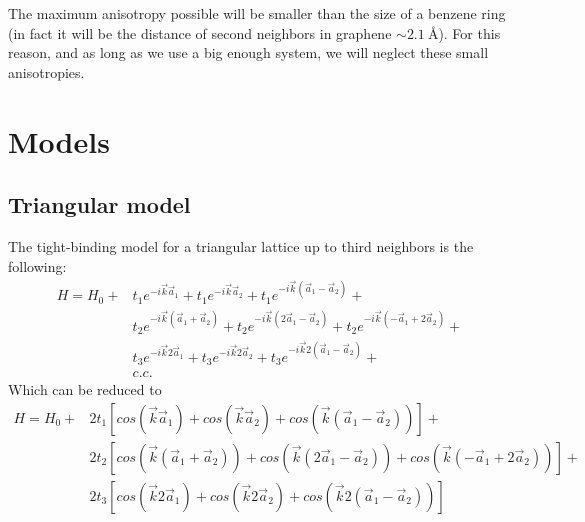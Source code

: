 The maximum anisotropy possible will be smaller than the size of a benzene ring (in fact it will be the distance of second neighbors in graphene $\sim\SI{2.1}{\angstrom}$). For this reason, and as long as we use a big enough system, we will neglect these small anisotropies.


\section{Models} %
\label{models}
\subsection{Triangular model}
The tight-binding model for a triangular lattice up to third neighbors is the following:
\begin{equation}
  \begin{split}
  H = H_0 +
      &t_1e^{-i\vec{k}\vec{a}_1} + t_1e^{-i\vec{k}\vec{a}_2} + t_1e^{-i\vec{k}(\vec{a}_1-\vec{a}_2)}+\\
      &t_2e^{-i\vec{k}(\vec{a}_1+\vec{a}_2)} + t_2e^{-i\vec{k}(2\vec{a}_1-\vec{a}_2)} +
      t_2e^{-i\vec{k}(-\vec{a}_1+2\vec{a}_2)}+\\
      &t_3e^{-i\vec{k}2\vec{a}_1} + t_3e^{-i\vec{k}2\vec{a}_2} + t_3e^{-i\vec{k}2(\vec{a}_1-\vec{a}_2)}+\\
      &c.c.
    \end{split}
\end{equation}
Which can be reduced to
\begin{equation}
  \begin{split}
  H = H_0 +
      &2t_1\left[cos(\vec{k}\vec{a}_1) + cos(\vec{k}\vec{a}_2) + cos(\vec{k}(\vec{a}_1-\vec{a}_2))\right]+\\
      &2t_2\left[cos(\vec{k}(\vec{a}_1+\vec{a}_2)) + cos(\vec{k}(2\vec{a}_1-\vec{a}_2)) +
      cos(\vec{k}(-\vec{a}_1+2\vec{a}_2))\right]+\\
      &2t_3\left[cos(\vec{k}2\vec{a}_1) + cos(\vec{k}2\vec{a}_2) + cos(\vec{k}2(\vec{a}_1-\vec{a}_2))\right]
    \end{split}
\end{equation}

